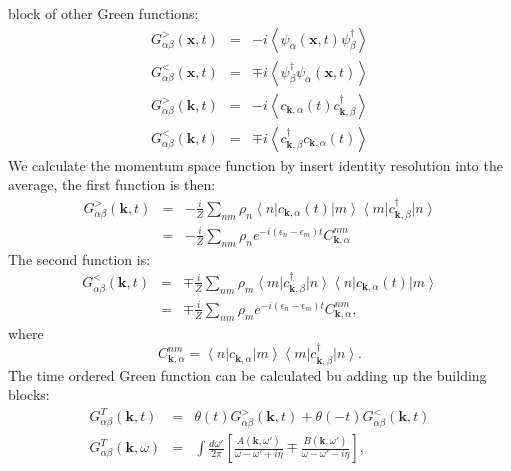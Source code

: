 \documentclass[journal=jacsat,manuscript=article]{achemso}
\begin{document}
block of other Green functions:
\begin{eqnarray}
	G_{\alpha\beta}^{>}\left(\bm{x},t\right) & = & -i\left\langle \psi_{\alpha}\left(\bm{x},t\right)\psi_{\beta}^{\dagger}\right\rangle \\
	G_{\alpha\beta}^{<}\left(\bm{x},t\right) & = & \mp i\left\langle \psi_{\beta}^{\dagger}\psi_{\alpha}\left(\bm{x},t\right)\right\rangle \\
	G_{\alpha\beta}^{>}\left(\bm{k},t\right) & = & -i\left\langle c_{\bm{k},\alpha}\left(t\right)c_{\bm{k},\beta}^{\dagger}\right\rangle \\
	G_{\alpha\beta}^{<}\left(\bm{k},t\right) & = & \mp i\left\langle c_{\bm{k},\beta}^{\dagger}c_{\bm{k},\alpha}\left(t\right)\right\rangle 
\end{eqnarray}
We calculate the momentum space function by insert identity resolution into the average, the first function is then:
\begin{eqnarray}
	G_{\alpha\beta}^{>}\left(\bm{k},t\right)\nonumber 
	& = & -\frac{i}{Z}\sum_{nm}\rho_{n}\left\langle n\right|c_{\bm{k},\alpha}\left(t\right)\left|m\right\rangle \left\langle m\right|c_{\bm{k},\beta}^{\dagger}\left|n\right\rangle \nonumber \\
	& = & -\frac{i}{Z}\sum_{nm}\rho_{n}e^{-i\left(\epsilon_{n}-\epsilon_{m}\right)t}C_{\bm{k},\alpha}^{nm}
\end{eqnarray}
The second function is:
\begin{eqnarray}
	G_{\alpha\beta}^{<}\left(\bm{k},t\right)\nonumber
 	& = & \mp\frac{i}{Z}\sum_{nm}\rho_{m}\left\langle m\right|c_{\bm{k},\beta}^{\dagger}\left|n\right\rangle \left\langle n\right|c_{\bm{k},\alpha}\left(t\right)\left|m\right\rangle \nonumber \\
 	& = & \mp\frac{i}{Z}\sum_{nm}\rho_{m}e^{-i\left(\epsilon_{n}-\epsilon_{m}\right)t}C_{\bm{k},\alpha}^{nm},
\end{eqnarray}
where
\begin{equation}
	C_{\bm{k},\alpha}^{nm}=\left\langle n\right|c_{\bm{k},\alpha}\left|m\right\rangle \left\langle m\right|c_{\bm{k},\beta}^{\dagger}\left|n\right\rangle .
\end{equation}
The time ordered Green function can be calculated bu adding up the building blocks:
\begin{eqnarray}
	G_{\alpha\beta}^{T}\left(\bm{k},t\right) & = & \theta\left(t\right)G_{\alpha\beta}^{>}\left(\bm{k},t\right)+\theta\left(-t\right)G_{\alpha\beta}^{<}\left(\bm{k},t\right)\\
	G_{\alpha\beta}^{T}\left(\bm{k},\omega\right) & = & \int\frac{d\omega'}{2\pi}\left[\frac{A\left(\bm{k},\omega'\right)}{\omega-\omega'+i\eta}\mp\frac{B\left(\bm{k},\omega'\right)}{\omega-\omega'-i\eta}\right],
\end{eqnarray}
\end{document}
